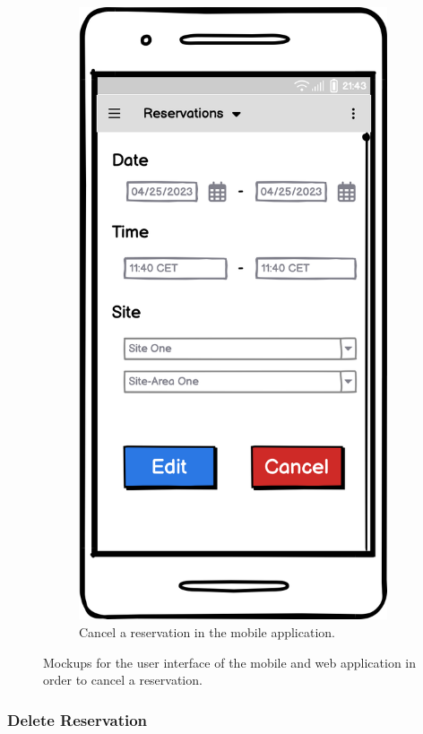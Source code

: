 \begin{figure}[h]
\begin{subfigure}[c]{0.3\textwidth}
         \includegraphics[width=\textwidth,height=1.6\textwidth,keepaspectratio]{resources/images/main/5_design/mockups/cancel_reservation/mobile/Cancel_Reservation.png}
         \caption{Cancel a reservation in the mobile application.}
         \label{fig:mobile-cancel-reservation-mockup}
    \end{subfigure}
    \caption{Mockups for the user interface of the mobile and web application in order to cancel a reservation.}
    \label{fig:mockups-cancel-reservation}
\end{figure}

\newpage

\subsubsection{Delete Reservation}
\label{ch:Design:sec:Reservation System:ssec:Management Capabilities:sssec:Delete Reservation}

